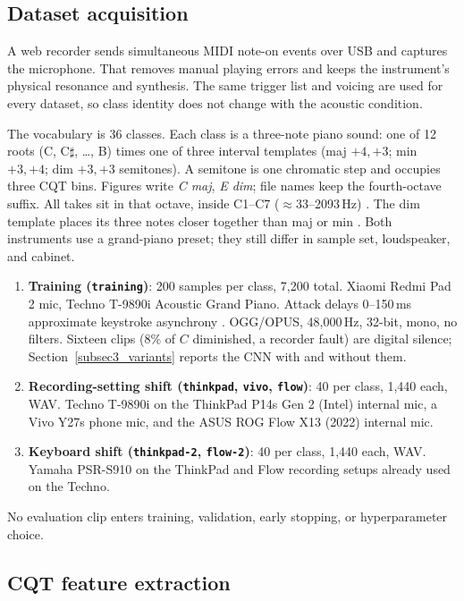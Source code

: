\documentclass[pdflatex,sn-mathphys-num,iicol]{sn-jnl}
\theoremstyle{thmstyleone}
\theoremstyle{thmstyletwo}
\theoremstyle{thmstylethree}
\begin{document}
\subsection{Dataset acquisition}\label{subsec3_1}

A web recorder sends simultaneous MIDI note-on events over USB and captures the microphone. That removes manual playing errors and keeps the instrument's physical resonance and synthesis. The same trigger list and voicing are used for every dataset, so class identity does not change with the acoustic condition.

The vocabulary is 36 classes. Each class is a three-note piano sound: one of 12 roots (C, C$\sharp$, \ldots, B) times one of three interval templates (maj $+4,+3$; min $+3,+4$; dim $+3,+3$ semitones). A semitone is one chromatic step and occupies three CQT bins. Figures write \emph{C maj}, \emph{E dim}; file names keep the fourth-octave suffix. All takes sit in that octave, inside C1--C7 ($\approx$33--2093\,Hz) \cite{Telila2023}\cite{Harte2010}. The dim template places its three notes closer together than maj or min \cite{Byambatsogt2020}. Both instruments use a grand-piano preset; they still differ in sample set, loudspeaker, and cabinet.

\begin{enumerate}[1.]
\item \textbf{Training (\texttt{training})}: 200 samples per class, 7{,}200 total. Xiaomi Redmi Pad 2 mic, Techno T-9890i Acoustic Grand Piano. Attack delays 0--150\,ms approximate keystroke asynchrony \cite{Bella2011}. OGG/OPUS, 48{,}000\,Hz, 32-bit, mono, no filters. Sixteen clips (8\% of $C$ diminished, a recorder fault) are digital silence; Section~\ref{subsec3_variants} reports the CNN with and without them.
\item \textbf{Recording-setting shift (\texttt{thinkpad}, \texttt{vivo}, \texttt{flow})}: 40 per class, 1{,}440 each, WAV. Techno T-9890i on the ThinkPad P14s Gen 2 (Intel) internal mic, a Vivo Y27s phone mic, and the ASUS ROG Flow X13 (2022) internal mic.
\item \textbf{Keyboard shift (\texttt{thinkpad-2}, \texttt{flow-2})}: 40 per class, 1{,}440 each, WAV. Yamaha PSR-S910 on the ThinkPad and Flow recording setups already used on the Techno.
\end{enumerate}

No evaluation clip enters training, validation, early stopping, or hyperparameter choice.

\subsection{CQT feature extraction}\label{subsec3_2}
\end{document}
